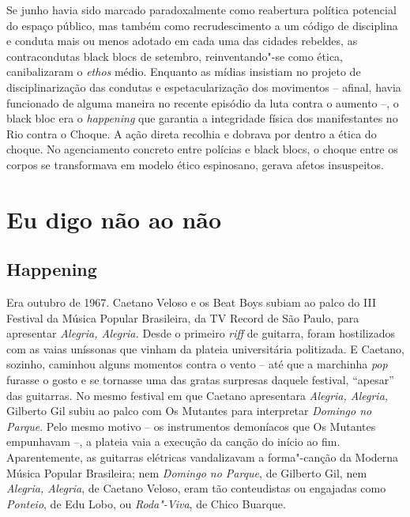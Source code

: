 Se junho havia sido marcado paradoxalmente como reabertura política
potencial do espaço público, mas também como recrudescimento a um código
de disciplina e conduta mais ou menos adotado em cada uma das cidades
rebeldes, as contracondutas black blocs de setembro, reinventando"-se
como ética, canibalizaram o \emph{ethos} médio. Enquanto as mídias
insistiam no projeto de disciplinarização das condutas e
espetacularização dos movimentos -- afinal, havia funcionado de alguma
maneira no recente episódio da luta contra o aumento --, o black bloc
era o \emph{happening }que garantia a integridade física dos
manifestantes no Rio contra o Choque. A ação direta recolhia e dobrava
por dentro a ética do choque. No agenciamento concreto entre polícias e
black blocs, o choque entre os corpos se transformava em modelo ético
espinosano, gerava afetos insuspeitos.


\section{Eu digo não ao não}

\subsection{Happening}

Era outubro de 1967. Caetano Veloso e os Beat Boys
subiam ao palco do III Festival da Música Popular Brasileira, da TV
Record de São Paulo, para apresentar \emph{Alegria, Alegria. }Desde o
primeiro \emph{riff} de guitarra, foram hostilizados com as vaias
uníssonas que vinham da plateia universitária politizada. E Caetano,
sozinho, caminhou alguns momentos contra o vento -- até que a marchinha
\emph{pop} furasse o gosto e se tornasse uma das gratas surpresas
daquele festival, ``apesar'' das guitarras. No mesmo festival em que
Caetano apresentara \emph{Alegria, Alegria,} Gilberto Gil subiu ao palco
com Os Mutantes para interpretar \emph{Domingo no Parque}. Pelo mesmo
motivo -- os instrumentos demoníacos que Os Mutantes empunhavam --, a
plateia vaia a execução da canção do início ao fim. Aparentemente, as
guitarras elétricas vandalizavam a forma"-canção da Moderna Música
Popular Brasileira; nem \emph{Domingo no Parque}, de Gilberto Gil, nem
\emph{Alegria, Alegria}, de Caetano Veloso, eram tão conteudistas ou
engajadas como \emph{Ponteio}, de Edu Lobo, ou \emph{Roda"-Viva},
de Chico Buarque.

